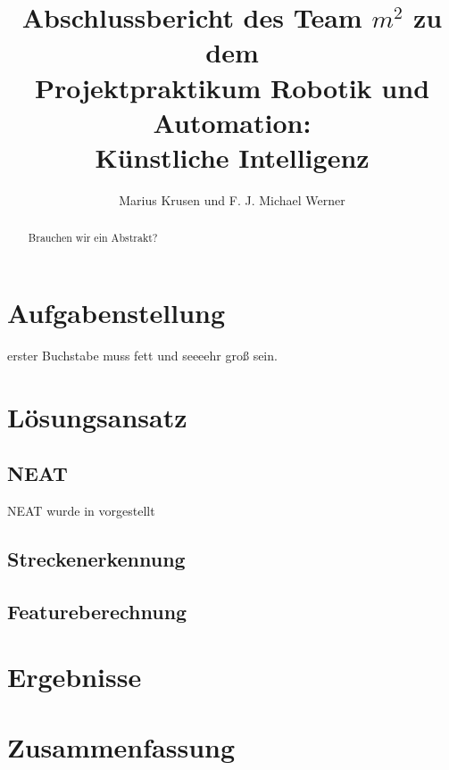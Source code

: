 \documentclass[11pt,final,journal,a4paper,towside,towcolumn]{IEEEtran}
\begin{document}
\title{Abschlussbericht des Team $m^2$ zu dem \\Projektpraktikum Robotik und Automation:\\Künstliche Intelligenz}
\author{Marius Krusen und F. J. Michael Werner}
\maketitle

\begin{abstract}
Brauchen wir ein Abstrakt?
\end{abstract}

\section{Aufgabenstellung}
 erster Buchstabe muss fett und seeeehr groß sein.
\\

\section{Lösungsansatz}

\subsection{NEAT}
NEAT wurde in \cite{stanley:gecco02-efficient} vorgestellt
\subsection{Streckenerkennung}

\subsection{Featureberechnung}

\section{Ergebnisse}

\section{Zusammenfassung}

{}

\end{document}
